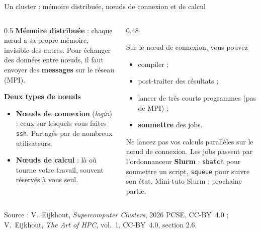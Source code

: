 \documentclass[8pt,aspectratio=169]{beamer}
\newcommand{\src}[1]{\vfill{\tiny\color{gray}Source : #1\par}}
\newcommand{\eij}{V.~Eijkhout, \emph{The Art of HPC}, vol.~1, CC-BY~4.0}
\begin{document}
\begin{frame}{Un cluster : mémoire distribuée, nœuds de connexion et de calcul}
\begin{columns}[T]
\begin{column}{0.5\textwidth}
\textbf{Mémoire distribuée} : chaque nœud a sa propre mémoire, invisible des autres. Pour échanger des données entre nœuds, il faut envoyer des \textbf{messages} sur le réseau (MPI).

\medskip
\textbf{Deux types de nœuds}
\begin{itemize}
\item \textbf{Nœuds de connexion} (\emph{login}) : ceux sur lesquels vous faites \texttt{ssh}. Partagés par de nombreux utilisateurs.
\item \textbf{Nœuds de calcul} : là où tourne votre travail, souvent réservés à vous seul.
\end{itemize}
\end{column}
\begin{column}{0.48\textwidth}
\begin{block}{Sur le nœud de connexion, vous pouvez}
\begin{itemize}
\item compiler ;
\item post-traiter des résultats ;
\item lancer de très courts programmes (pas de MPI) ;
\item \textbf{soumettre} des jobs.
\end{itemize}
\end{block}
\begin{alertblock}{Ne lancez pas vos calculs parallèles sur le nœud de connexion.}
Les jobs passent par l'ordonnanceur \textbf{Slurm} : \texttt{sbatch} pour soumettre un script, \texttt{squeue} pour suivre son état. Mini-tuto Slurm : prochaine partie.
\end{alertblock}
\end{column}
\end{columns}
\src{V.~Eijkhout, \emph{Supercomputer Clusters}, 2026 PCSE, CC-BY~4.0 ; \eij{}, section 2.6.}
\end{frame}
\end{document}
